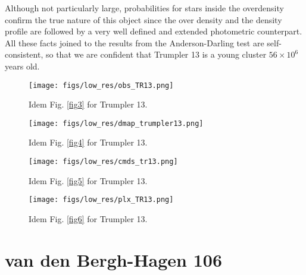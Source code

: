 \documentclass{aa}
\begin{document}
Although not particularly large, probabilities for stars inside the
overdensity confirm the true nature of this object since the over density
and the density profile are followed by a very well defined and extended
photometric counterpart. All these facts joined to the results from the
Anderson-Darling test are self-consistent, so that we are confident that
Trumpler 13 is a young cluster $56\times10^6$ years old.

\begin{figure*}[ht]
    \centering
    \texttt{[image: figs/low\_res/obs\_TR13.png]}
    \caption{Idem Fig. \ref{fig3} for Trumpler 13.}
    \label{fig39}
\end{figure*}
\begin{figure*}[ht]
    \centering
    \texttt{[image: figs/low\_res/dmap\_trumpler13.png]}
    \caption{Idem Fig. \ref{fig4} for Trumpler 13.}
    \label{fig40}
\end{figure*}
\begin{figure*}[ht]
    \centering
    \texttt{[image: figs/low\_res/cmds\_tr13.png]}
    \caption{Idem Fig. \ref{fig5} for Trumpler 13.}
    \label{fig41}
\end{figure*}
\begin{figure*}[ht]
    \centering
    \texttt{[image: figs/low\_res/plx\_TR13.png]}
    \caption{Idem Fig. \ref{fig6} for Trumpler 13.}
    \label{fig42}
\end{figure*}



\section{van den Bergh-Hagen 106}
\end{document}

